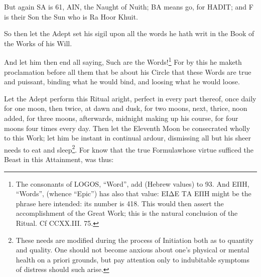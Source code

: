 But again SA is 61, AIN, the Naught of Nuith; BA means go, for HADIT; and F is their Son the Sun who is Ra \textemdash{} Hoor \textemdash{} Khuit.

So then let the Adept set his sigil upon all the words he hath writ in the Book of the Works of his Will.

And let him then end all saying, Such are the Words!\footnote{The consonants of LOGOS, \enquote{Word}, add (Hebrew values) to 93. And \textgreek{ΕΠΗ}, \enquote{Words}, (whence \enquote{Epic}) has also that value: \textgreek{ΕΙΔΕ ΤΑ ΕΠΗ} might be the phrase here intended: its number is 418. This would then assert the accomplishment of the Great Work; this is the natural conclusion of the Ritual. Cf CCXX.III. 75.} For by this he maketh proclamation before all them that be about his Circle that these Words are true and puissant, binding what he would bind, and loosing what he would loose.

Let the Adept perform this Ritual aright, perfect in every part thereof, once daily for one moon, then twice, at dawn and dusk, for two moons, next, thrice, noon added, for three moons, afterwards, midnight making up his course, for four moons four times every day. Then let the Eleventh Moon be consecrated wholly to this Work; let him be instant in continual ardour, dismissing all but his sheer needs to eat and sleep\footnote{These needs are modified during the process of Initiation both as to quantity and quality. One should not become anxious about one's physical or mental health on a priori grounds, but pay attention only to indubitable symptoms of distress should such arise.}. For know that the true Formula\footnotemark whose virtue sufficed the Beast in this Attainment, was thus:



